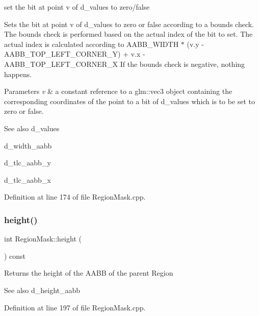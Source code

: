 set the bit at point v of d\+\_\+values to zero/false 

Sets the bit at point v of d\+\_\+values to zero or false according to a bounds check. The bounds check is performed based on the actual index of the bit to set. The actual index is calculated according to A\+A\+B\+B\+\_\+\+W\+I\+D\+TH $\ast$ (v.\+y -\/ A\+A\+B\+B\+\_\+\+T\+O\+P\+\_\+\+L\+E\+F\+T\+\_\+\+C\+O\+R\+N\+E\+R\+\_\+Y) + v.\+x -\/ A\+A\+B\+B\+\_\+\+T\+O\+P\+\_\+\+L\+E\+F\+T\+\_\+\+C\+O\+R\+N\+E\+R\+\_\+X If the bounds check is negative, nothing happens.


\begin{DoxyParams}{Parameters}
{\em v} & a constant reference to a glm\+::vec3 object containing the corresponding coordinates of the point to a bit of d\+\_\+values which is to be set to zero or false.\\
\hline
\end{DoxyParams}
\begin{DoxySeeAlso}{See also}
d\+\_\+values 

d\+\_\+width\+\_\+aabb 

d\+\_\+tlc\+\_\+aabb\+\_\+y 

d\+\_\+tlc\+\_\+aabb\+\_\+x 
\end{DoxySeeAlso}


Definition at line 174 of file Region\+Mask.\+cpp.

\mbox{\label{class_region_mask_ab6b1a79837b40af8f309f3f725d48891}} 
\subsubsection{\texorpdfstring{height()}{height()}}
{\footnotesize\ttfamily int Region\+Mask\+::height (\begin{DoxyParamCaption}{ }\end{DoxyParamCaption}) const}

\begin{DoxyReturn}{Returns}
the height of the A\+A\+BB of the parent Region
\end{DoxyReturn}
\begin{DoxySeeAlso}{See also}
d\+\_\+height\+\_\+aabb 
\end{DoxySeeAlso}


Definition at line 197 of file Region\+Mask.\+cpp.

\mbox{\label{class_region_mask_ad8ea284da3d4643735b4c652cbb8a3ab}} 
